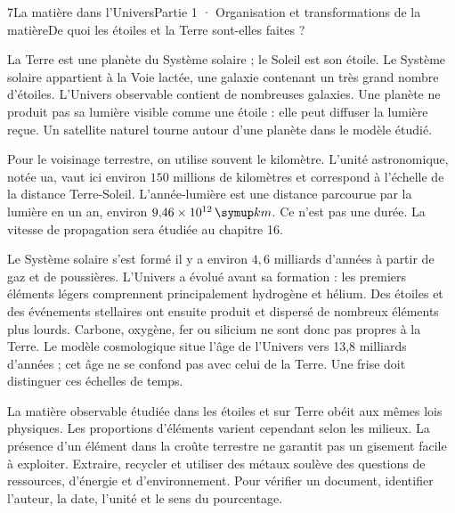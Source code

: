 \begin{ouverture}[college1]{7}{La matière dans l’Univers}{Partie 1 · Organisation et transformations de la matière}{De quoi les étoiles et la Terre sont-elles faites ?}
\end{ouverture}
\label{ess-7}
La Terre est une planète du Système solaire ; le Soleil est son étoile. Le Système solaire appartient à la Voie lactée, une galaxie contenant un très grand nombre d’étoiles. L’Univers observable contient de nombreuses galaxies. Une planète ne produit pas sa lumière visible comme une étoile : elle peut diffuser la lumière reçue. Un satellite naturel tourne autour d’une planète dans le modèle étudié.\par
{}
Pour le voisinage terrestre, on utilise souvent le kilomètre. L’unité astronomique, notée ua, vaut ici environ $150$ millions de kilomètres et correspond à l’échelle de la distance Terre-Soleil. L’année-lumière est une distance parcourue par la lumière en un an, environ $9{,}46\times10^{12}\unite{km}$. Ce n’est pas une durée. La vitesse de propagation sera étudiée au chapitre 16.\par
\clearpage
{}
Le Système solaire s’est formé il y a environ $4{,}6$ milliards d’années à partir de gaz et de poussières. L’Univers a évolué avant sa formation : les premiers éléments légers comprennent principalement hydrogène et hélium. Des étoiles et des événements stellaires ont ensuite produit et dispersé de nombreux éléments plus lourds. Carbone, oxygène, fer ou silicium ne sont donc pas propres à la Terre. Le modèle cosmologique situe l’âge de l’Univers vers 13,8 milliards d’années ; cet âge ne se confond pas avec celui de la Terre. Une frise doit distinguer ces échelles de temps.\par
{}
La matière observable étudiée dans les étoiles et sur Terre obéit aux mêmes lois physiques. Les proportions d’éléments varient cependant selon les milieux. La présence d’un élément dans la croûte terrestre ne garantit pas un gisement facile à exploiter. Extraire, recycler et utiliser des métaux soulève des questions de ressources, d’énergie et d’environnement. Pour vérifier un document, identifier l’auteur, la date, l’unité et le sens du pourcentage.\par
